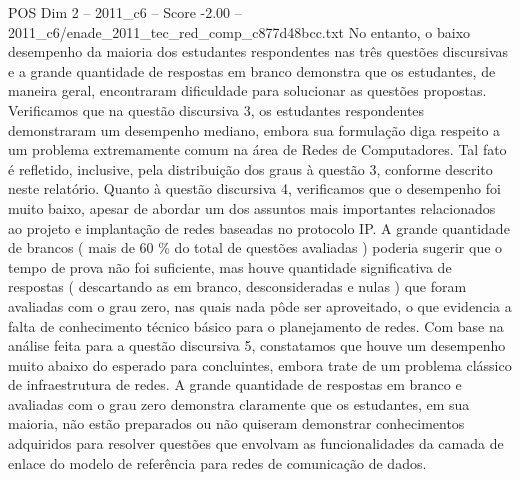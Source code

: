 \begin{textsample}{POS Dim 2 – 2011\_c6 – Score -2.00 – 2011\_c6/enade\_2011\_tec\_red\_comp\_c877d48bcc.txt}
No entanto, o baixo desempenho da maioria dos estudantes respondentes nas três questões discursivas e a grande quantidade de respostas em branco demonstra que os estudantes, de maneira geral, encontraram dificuldade para solucionar as questões propostas.
Verificamos que na questão discursiva 3, os estudantes respondentes demonstraram um desempenho mediano, embora sua formulação diga respeito a um problema extremamente comum na área de Redes de Computadores.
Tal fato é refletido, inclusive, pela distribuição dos graus à questão 3, conforme descrito neste relatório.
Quanto à questão discursiva 4, verificamos que o desempenho foi muito baixo, apesar de abordar um dos assuntos mais importantes relacionados ao projeto e implantação de redes baseadas no protocolo IP.
A grande quantidade de brancos ( mais de 60 \% do total de questões avaliadas ) poderia sugerir que o tempo de prova não foi suficiente, mas houve quantidade significativa de respostas ( descartando as em branco, desconsideradas e nulas ) que foram avaliadas com o grau zero, nas quais nada pôde ser aproveitado, o que evidencia a falta de conhecimento técnico básico para o planejamento de redes.
Com base na análise feita para a questão discursiva 5, constatamos que houve um desempenho muito abaixo do esperado para concluintes, embora trate de um problema clássico de infraestrutura de redes.
A grande quantidade de respostas em branco e avaliadas com o grau zero demonstra claramente que os estudantes, em sua maioria, não estão preparados ou não quiseram demonstrar conhecimentos adquiridos para resolver questões que envolvam as funcionalidades da camada de enlace do modelo de referência para redes de comunicação de dados.

\end{textsample}
